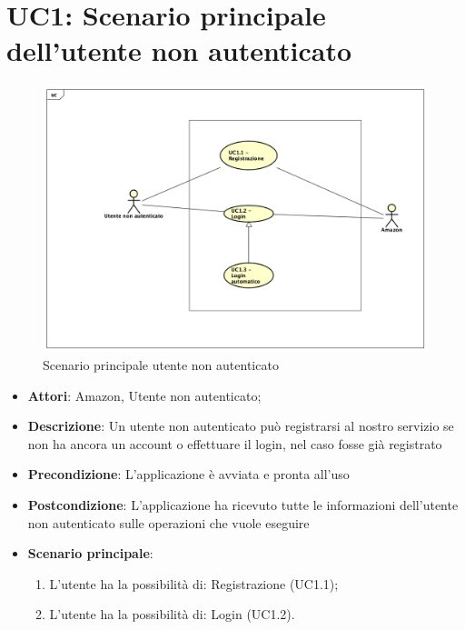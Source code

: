 \section{UC1: Scenario principale dell'utente non autenticato}
\label{UC1}
\begin{figure}[h]
	\centering
	\includegraphics[scale=0.4]{Diagram/UC1.png}
	\caption{Scenario principale utente non autenticato}\label{}
\end{figure}
\begin{itemize}
	\item \textbf{Attori}: Amazon, Utente non autenticato;
	\item \textbf{Descrizione}: Un utente non autenticato può registrarsi al nostro servizio se non ha ancora un account o effettuare il login, nel caso fosse già registrato
	\item \textbf{Precondizione}: L'applicazione è avviata e pronta all'uso
	\item \textbf{Postcondizione}: L'applicazione ha ricevuto tutte le informazioni dell'utente non autenticato sulle operazioni che vuole eseguire
	\item \textbf{Scenario principale}:
	\begin{enumerate} \item L'utente ha la possibilità di: Registrazione (UC1.1);  \item 
		L'utente ha la possibilità di: Login (UC1.2).\end{enumerate}
\end{itemize}

